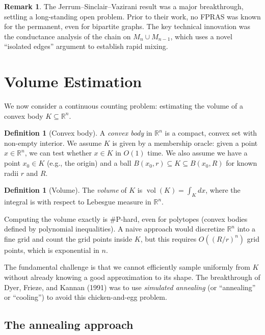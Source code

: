 \documentclass[twoside,12pt]{book}
\theoremstyle{plain}
\theoremstyle{definition}
\newtheorem{definition}[theorem]{Definition}
\newtheorem{remark}[theorem]{Remark}
\theoremstyle{remark}
\begin{document}
\begin{remark}
The Jerrum--Sinclair--Vazirani result was a major breakthrough, settling a long-standing open problem. Prior to their work, no FPRAS was known for the permanent, even for bipartite graphs. The key technical innovation was the conductance analysis of the chain on $M_n \cup M_{n-1}$, which uses a novel ``isolated edges'' argument to establish rapid mixing.
\end{remark}

\section{Volume Estimation}
\label{sec:volume}

We now consider a continuous counting problem: estimating the volume of a convex body $K \subseteq \mathbb{R}^n$.

\begin{definition}[Convex body]
A \emph{convex body} in $\mathbb{R}^n$ is a compact, convex set with non-empty interior. We assume $K$ is given by a membership oracle: given a point $x \in \mathbb{R}^n$, we can test whether $x \in K$ in $O(1)$ time. We also assume we have a point $x_0 \in K$ (e.g., the origin) and a ball $B(x_0, r) \subseteq K \subseteq B(x_0, R)$ for known radii $r$ and $R$.
\end{definition}

\begin{definition}[Volume]
The \emph{volume} of $K$ is $\operatorname{vol}(K) = \int_K dx$, where the integral is with respect to Lebesgue measure in $\mathbb{R}^n$.
\end{definition}

Computing the volume exactly is \#P-hard, even for polytopes (convex bodies defined by polynomial inequalities). A naive approach would discretize $\mathbb{R}^n$ into a fine grid and count the grid points inside $K$, but this requires $O((R/r)^n)$ grid points, which is exponential in $n$.

The fundamental challenge is that we cannot efficiently sample uniformly from $K$ without already knowing a good approximation to its shape. The breakthrough of Dyer, Frieze, and Kannan (1991) was to use \emph{simulated annealing} (or ``annealing'' or ``cooling'') to avoid this chicken-and-egg problem.

\subsection{The annealing approach}
\end{document}
